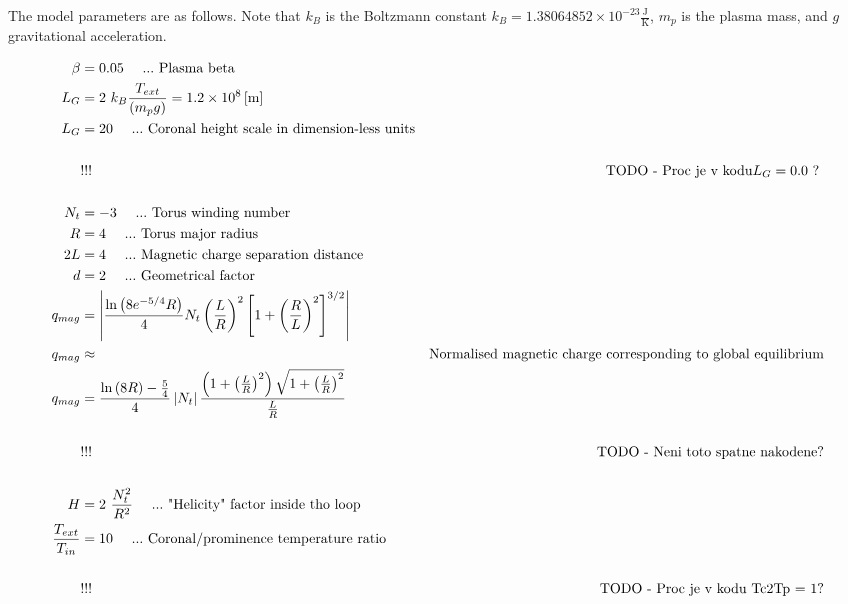 The model parameters are as follows. Note that $k_B$ is the Boltzmann constant $k_B = 1.38064852 \times 10^{-23} \frac{\mathrm{J}}{\mathrm{K}}$, $m_p$ is the plasma mass, and $g$ gravitational acceleration.

\begin{align}
\beta & =  0.05\ \ \ \ ...\ \text{Plasma beta}\\
L_G & =  2\ k_B \frac{T_{ext}}{\lo m_p g \ro} = 1.2 \times 10^8 \left[\text{m}\right]\\
L_G & =  20 \ \ \ \ ...\ \text{Coronal height scale in dimension-less units}\\
\\
& !!! & \text{TODO - Proc je v kodu} L_G = 0.0 \ ?\
\\ \\
N_t & = -3\ \ \ \ ...\ \text{Torus winding number}\\
R & = 4\ \ \ \ ...\ \text{Torus major radius}\\
2L & =  4\ \ \ \ ...\ \text{Magnetic charge separation distance}\\
d & =  2\ \ \ \ ...\ \text{Geometrical factor}\\
q_{mag} & =  \left| \frac{\ln\lo 8 e^{-5/4} R\ro}{4} N_t \lo\frac{L}{R}\ro^2\left[1 + \lo\frac{R}{L}\ro^2\right]^{3/2}\right|\\
q_{mag} & \approx & \text{Normalised magnetic charge corresponding to global equilibrium}\\
q_{mag} & =  \frac{ \ln\lo 8R \ro - \frac{5}{4}}{4} \left| N_t \right| \frac{\lo 1 + \lo\frac{L}{R}\ro^2\ro \sqrt{1 + \lo\frac{L}{R}\ro^2}}{\frac{L}{R}}\\
\\
& !!! & \text{TODO - Neni toto spatne nakodene?}
\\\ \\
H & =  2\ \frac{N_t^2}{R^2}\ \ \ \ ...\ \text{"Helicity" factor inside tho loop}\\
\frac{ T_{ext} }{T_{in}} & =  10\ \ \ \ ...\ \text{Coronal/prominence temperature ratio}\\
\\
& !!! & \text{TODO - Proc je v kodu Tc2Tp = 1?}
\\\ \\
\end{align}